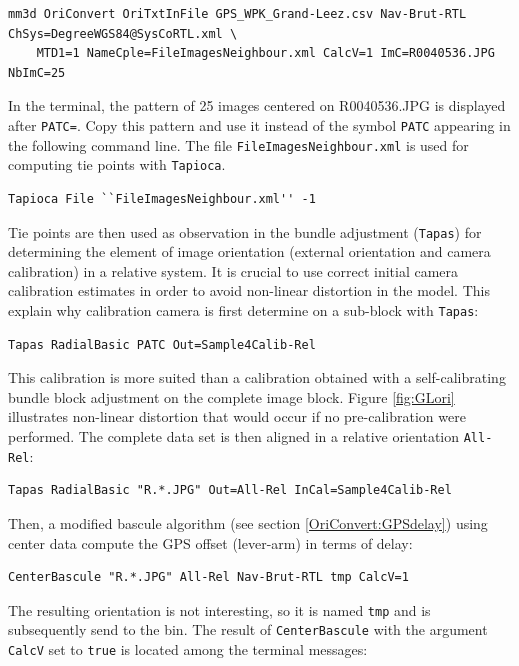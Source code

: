 \begin{verbatim}
mm3d OriConvert OriTxtInFile GPS_WPK_Grand-Leez.csv Nav-Brut-RTL ChSys=DegreeWGS84@SysCoRTL.xml \
	MTD1=1 NameCple=FileImagesNeighbour.xml CalcV=1 ImC=R0040536.JPG NbImC=25
\end{verbatim}

In the terminal, the pattern of 25 images centered on R0040536.JPG is displayed after {\tt PATC=}. Copy this pattern and use it instead of the symbol {\tt PATC} appearing in the following command line.
The file {\tt FileImagesNeighbour.xml} is used for computing tie points with {\tt Tapioca}. 

\begin{verbatim}
Tapioca File ``FileImagesNeighbour.xml'' -1
\end{verbatim}

Tie points are then used as observation in the bundle adjustment ({\tt Tapas}) for determining the element of image orientation (external orientation and camera calibration) in a relative system. It is crucial to use correct initial camera calibration estimates in order to avoid non-linear distortion in the model. This explain why calibration camera is first determine on a sub-block with {\tt Tapas}:

\begin{verbatim}
Tapas RadialBasic PATC Out=Sample4Calib-Rel
\end{verbatim}

This calibration is more suited than a calibration obtained with a self-calibrating bundle block adjustment on the complete image block. Figure \ref{fig:GLori} illustrates non-linear distortion that would occur if no pre-calibration were performed. The complete data set is then aligned in a relative orientation {\tt All-Rel}:

\begin{verbatim}
Tapas RadialBasic "R.*.JPG" Out=All-Rel InCal=Sample4Calib-Rel 
\end{verbatim}

Then, a modified bascule algorithm (see section \ref{OriConvert:GPSdelay}) using center data compute the GPS offset (lever-arm) in terms of delay:

\begin{verbatim}
CenterBascule "R.*.JPG" All-Rel Nav-Brut-RTL tmp CalcV=1
\end{verbatim}

The resulting orientation is not interesting, so it is named {\tt tmp} and is subsequently send to the bin. The result of {\tt CenterBascule} with the argument {\tt CalcV} set to {\tt true} is located among the terminal messages:

